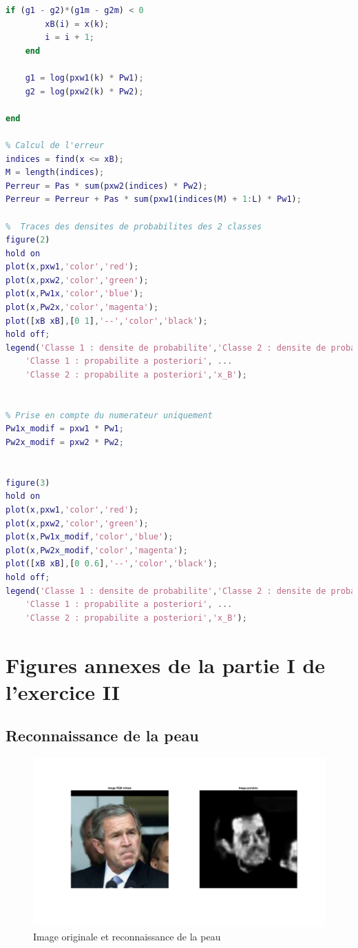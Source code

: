 \documentclass[11pt,a4paper]{article}
\begin{document}
\begin{lstlisting}[language=matlab]
    if (g1 - g2)*(g1m - g2m) < 0
        xB(i) = x(k);
        i = i + 1;
    end
    
    g1 = log(pxw1(k) * Pw1);
    g2 = log(pxw2(k) * Pw2);
    
end

% Calcul de l'erreur
indices = find(x <= xB);
M = length(indices);
Perreur = Pas * sum(pxw2(indices) * Pw2);
Perreur = Perreur + Pas * sum(pxw1(indices(M) + 1:L) * Pw1);

%  Traces des densites de probabilites des 2 classes
figure(2) 
hold on
plot(x,pxw1,'color','red');
plot(x,pxw2,'color','green');
plot(x,Pw1x,'color','blue');
plot(x,Pw2x,'color','magenta');
plot([xB xB],[0 1],'--','color','black');
hold off;
legend('Classe 1 : densite de probabilite','Classe 2 : densite de probabilite', ...
	'Classe 1 : propabilite a posteriori', ...
	'Classe 2 : propabilite a posteriori','x_B');

    
% Prise en compte du numerateur uniquement
Pw1x_modif = pxw1 * Pw1;
Pw2x_modif = pxw2 * Pw2;


figure(3) 
hold on
plot(x,pxw1,'color','red');
plot(x,pxw2,'color','green');
plot(x,Pw1x_modif,'color','blue');
plot(x,Pw2x_modif,'color','magenta');
plot([xB xB],[0 0.6],'--','color','black');
hold off;
legend('Classe 1 : densite de probabilite','Classe 2 : densite de probabilite', ...
	'Classe 1 : propabilite a posteriori', ...
	'Classe 2 : propabilite a posteriori','x_B');
\end{lstlisting}

\newpage
\section{Figures annexes de la partie I de l'exercice II}
\subsection{Reconnaissance de la peau}
\label{an.reconn}

\begin{figure}[H]
\center
\includegraphics[width=12cm]{exo2_skin2.png}
\caption{Image originale et reconnaissance de la peau}

\end{figure}
\end{document}

